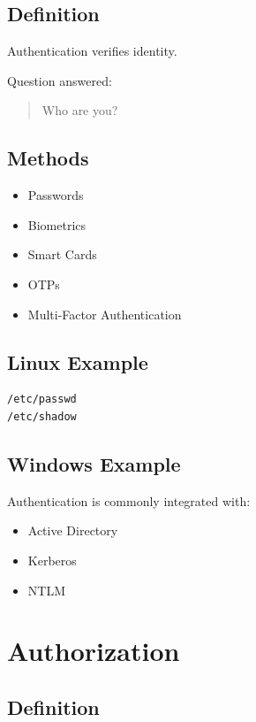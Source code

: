 \subsection{Definition}

Authentication verifies identity.

Question answered:

\begin{quote}
Who are you?
\end{quote}

\subsection{Methods}

\begin{itemize}
\item Passwords
\item Biometrics
\item Smart Cards
\item OTPs
\item Multi-Factor Authentication
\end{itemize}

\subsection{Linux Example}

\begin{verbatim}
/etc/passwd
/etc/shadow
\end{verbatim}

\subsection{Windows Example}

Authentication is commonly integrated with:

\begin{itemize}
\item Active Directory
\item Kerberos
\item NTLM
\end{itemize}

\section{Authorization}

\subsection{Definition}

